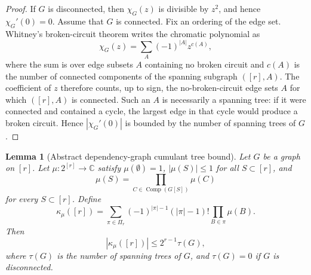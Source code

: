 \documentclass[11pt]{article}
\newtheorem{lemma}[theorem]{Lemma}
\newcommand{\C}{\mathbb{C}}
\newcommand{\Comp}{\operatorname{Comp}}
\begin{document}
\begin{proof}
  If $G$ is disconnected, then $\chi_G(z)$ is divisible by $z^2$, and hence
  $\chi_G'(0)=0$.  Assume that $G$ is connected.  Fix an ordering of the edge
  set.  Whitney's broken-circuit theorem writes the chromatic polynomial as
  \begin{equation}\label{eq:whitney-broken-circuit}
    \chi_G(z)
    =
    \sum_{A}(-1)^{|A|}z^{c(A)},
  \end{equation}
  where the sum is over edge subsets $A$ containing no broken circuit and
  $c(A)$ is the number of connected components of the spanning subgraph
  $([r],A)$.  The coefficient of $z$ therefore counts, up to sign, the
  no-broken-circuit edge sets $A$ for which $([r],A)$ is connected.  Such an
  $A$ is necessarily a spanning tree: if it were connected and contained a
  cycle, the largest edge in that cycle would produce a broken circuit.  Hence
  $|\chi_G'(0)|$ is bounded by the number of spanning trees of $G$.
\end{proof}

\begin{lemma}[Abstract dependency-graph cumulant tree bound]
  \label{lem:abstract-dependency-tree-bound}
  Let $G$ be a graph on $[r]$.  Let $\mu:2^{[r]}\to\C$ satisfy
  $\mu(\emptyset)=1$, $|\mu(S)|\leq1$ for all $S\subset[r]$, and
  \begin{equation}\label{eq:abstract-factorization}
    \mu(S)
    =
    \prod_{C\in\Comp(G[S])}\mu(C)
  \end{equation}
  for every $S\subset[r]$.  Define
  \begin{equation}\label{eq:abstract-cumulant}
    \kappa_\mu([r])
    =
    \sum_{\pi\in\Pi_r}
    (-1)^{|\pi|-1}(|\pi|-1)!
    \prod_{B\in\pi}\mu(B).
  \end{equation}
  Then
  \begin{equation}\label{eq:abstract-tree-bound}
    |\kappa_\mu([r])|
    \leq
    2^{r-1}\tau(G),
  \end{equation}
  where $\tau(G)$ is the number of spanning trees of $G$, and $\tau(G)=0$ if
  $G$ is disconnected.
\end{lemma}
\end{document}
